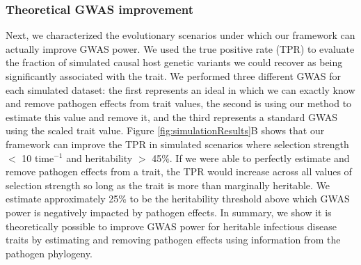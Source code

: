 \documentclass[11pt]{article}
\begin{document}
\begin{linenumbers}
\subsubsection*{Theoretical GWAS improvement}

Next, we characterized the evolutionary scenarios under which our framework can actually improve GWAS power. We used the true positive rate (TPR) to evaluate the fraction of simulated causal host genetic variants we could recover as being significantly associated with the trait. We performed three different GWAS for each simulated dataset: the first represents an ideal in which we can exactly know and remove pathogen effects from trait values, the second is using our method to estimate this value and remove it, and the third represents a standard GWAS using the scaled trait value. Figure \ref{fig:simulationResults}B shows that our framework can improve the TPR in simulated scenarios where selection strength $<$ 10 time$^{-1}$ and heritability $>$ 45\%. If we were able to perfectly estimate and remove pathogen effects from a trait, the TPR would increase across all values of selection strength so long as the trait is more than marginally heritable. We estimate approximately 25\% to be the heritability threshold above which GWAS power is negatively impacted by pathogen effects. In summary, we show it is theoretically possible to improve GWAS power for heritable infectious disease traits by estimating and removing pathogen effects using information from the pathogen phylogeny.



\end{linenumbers}
\end{document}
